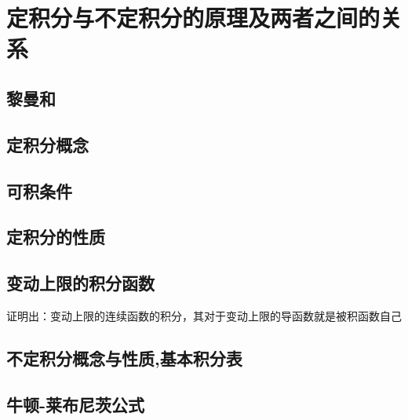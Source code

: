 
\section{定积分与不定积分的原理及两者之间的关系}
\label{sec:principle-and-relation-between-definite-and-indefinite-integral}

\subsection{黎曼和}
\label{sec:riemann-sum}

\subsection{定积分概念}
\label{sec:concept-of-definite-integral}

\subsection{可积条件}
\label{sec:integrable-function}

\subsection{定积分的性质}
\label{sec:properties-of-definite-integral}


\subsection{变动上限的积分函数}
\label{sec:variable-upper-limit-integral-function}

证明出：变动上限的连续函数的积分，其对于变动上限的导函数就是被积函数自己

\subsection{不定积分概念与性质,基本积分表}
\label{sec:indefinite-integral}

\subsection{牛顿-莱布尼茨公式}
\label{sec:newton-leibniz-formular}











